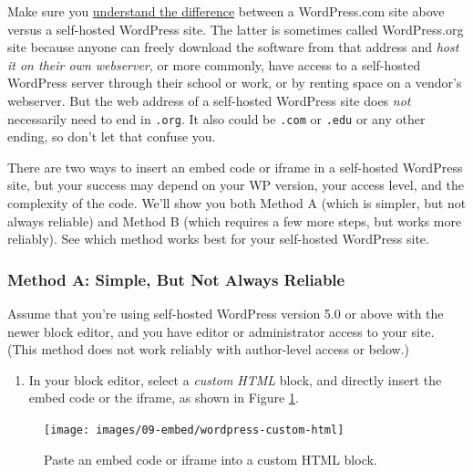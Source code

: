 \documentclass[
  english,
]{book}
\providecommand{\tightlist}{%
  \setlength{\itemsep}{0pt}\setlength{\parskip}{0pt}}
\begin{document}
Make sure you \href{https://wordpress.com/support/com-vs-org/}{understand the difference} between a WordPress.com site above versus a self-hosted WordPress site. The latter is sometimes called WordPress.org site because anyone can freely download the software from that address and \emph{host it on their own webserver}, or more commonly, have access to a self-hosted WordPress server through their school or work, or by renting space on a vendor's webserver. But the web address of a self-hosted WordPress site does \emph{not} necessarily need to end in \texttt{.org}. It also could be \texttt{.com} or \texttt{.edu} or any other ending, so don't let that confuse you.

There are two ways to insert an embed code or iframe in a self-hosted WordPress site, but your success may depend on your WP version, your access level, and the complexity of the code. We'll show you both Method A (which is simpler, but not always reliable) and Method B (which requires a few more steps, but works more reliably). See which method works best for your self-hosted WordPress site.

\hypertarget{method-a-simple-but-not-always-reliable}{%
\subsubsection*{Method A: Simple, But Not Always Reliable}\label{method-a-simple-but-not-always-reliable}}

Assume that you're using self-hosted WordPress version 5.0 or above with the newer block editor, and you have editor or administrator access to your site. (This method does not work reliably with author-level access or below.)

\begin{enumerate}
\def\labelenumi{\arabic{enumi}.}
\tightlist
\item
  In your block editor, select a \emph{custom HTML} block, and directly insert the embed code or the iframe, as shown in Figure \ref{fig:wordpress-custom-html}.
\end{enumerate}



\begin{figure}
\texttt{[image: images/09-embed/wordpress-custom-html]} \caption{Paste an embed code or iframe into a custom HTML block.}\label{fig:wordpress-custom-html}
\end{figure}
\end{document}
